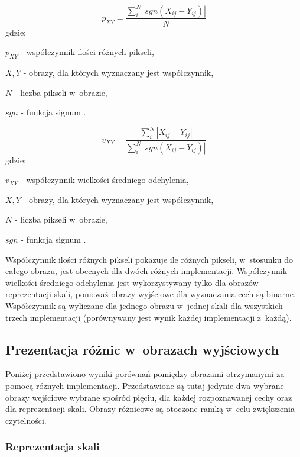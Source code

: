 \begin{equation}
\label{eq:procentZlychPikseli}
p_{XY} = \frac{\sum_{i}^{N}|sgn(X_{ij}-Y_{ij})	|}{N}
\end{equation}
gdzie:

$ p_{XY} $ - współczynnik ilości różnych pikseli,

$ X, Y $ - obrazy, dla których wyznaczany jest współczynnik,

$ N $ - liczba pikseli w~obrazie,

$ sgn $ - funkcja signum \cite{Signum}.

\begin{equation}
\label{eq:sredniaOdchylenia}
v_{XY} = \frac{\sum_{i}^{N}|X_{ij}-Y_{ij}|}{\sum_{i}^{N}|sgn(X_{ij}-Y_{ij})|}
\end{equation}
gdzie:

$ v_{XY} $ - współczynnik wielkości średniego odchylenia,

$ X, Y $ - obrazy, dla których wyznaczany jest współczynnik,

$ N $ - liczba pikseli w~obrazie,

$ sgn $ - funkcja signum \cite{Signum}.

Współczynnik ilości różnych pikseli pokazuje ile różnych pikseli, w~stosunku do całego obrazu, jest obecnych dla dwóch różnych implementacji. Współczynnik wielkości średniego odchylenia jest wykorzystywany tylko dla obrazów reprezentacji skali, ponieważ obrazy wyjściowe dla wyznaczania cech są binarne. Współczynnik są wyliczane dla jednego obrazu w~jednej skali dla wszystkich trzech implementacji (porównywany jest wynik każdej implementacji z~każdą).

\subsection{Prezentacja różnic w~obrazach wyjściowych}
\label{subsec:prezentacjaObrazowRoznicowych}

Poniżej przedstawiono wyniki porównań pomiędzy obrazami otrzymanymi za pomocą różnych implementacji. Przedstawione są tutaj jedynie dwa wybrane obrazy wejściowe wybrane spośród pięciu, dla każdej rozpoznawanej cechy oraz dla reprezentacji skali. Obrazy różnicowe są otoczone ramką w~celu zwiększenia czytelności.

\subsubsection{Reprezentacja skali}
\label{subsubsec:reprezentacjaSkaliRysunki}

